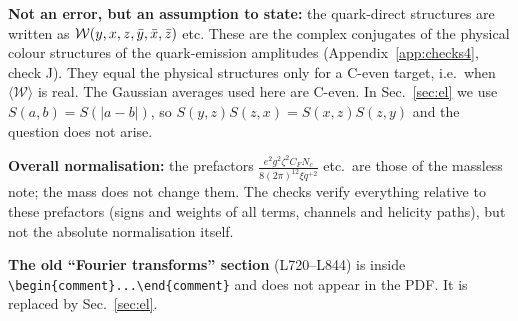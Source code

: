 \documentclass[9pt]{article}
\numberwithin{equation}{section}
\begin{document}
\noindent\textbf{Not an error, but an assumption to state:} the quark-direct structures are written as $\mathcal{W}(y,x,z,\Bar{y},\Bar{x},\Bar{z})$ etc. These are the complex conjugates of the physical colour structures of the quark-emission amplitudes (Appendix~\ref{app:checks4}, check J). They equal the physical structures only for a C-even target, i.e.\ when $\langle\mathcal{W}\rangle$ is real. The Gaussian averages used here are C-even. In Sec.~\ref{sec:el} we use $S(a,b)=S(|a-b|)$, so $S(y,z)S(z,x)=S(x,z)S(z,y)$ and the question does not arise.

\noindent\textbf{Overall normalisation:} the prefactors $\frac{e^{2}g^{2}\zeta^{2}C_{F}N_{c}}{8(2\pi)^{12}\xi q^{+2}}$ etc.\ are those of the massless note; the mass does not change them. The checks verify everything relative to these prefactors (signs and weights of all terms, channels and helicity paths), but not the absolute normalisation itself.

\noindent\textbf{The old ``Fourier transforms'' section} (L720--L844) is inside \verb|\begin{comment}...\end{comment}| and does not appear in the PDF. It is replaced by Sec.~\ref{sec:el}.
\end{document}
